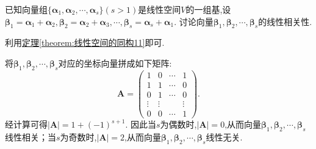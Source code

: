 \documentclass[../../main.tex]{subfiles}%
\begin{document}
\begin{example}
已知向量组\(\{\boldsymbol{\alpha}_1,\boldsymbol{\alpha}_2,\cdots,\boldsymbol{\alpha}_s\}(s > 1)\)是线性空间\(V\)的一组基,设\(\boldsymbol{\beta}_1=\boldsymbol{\alpha}_1+\boldsymbol{\alpha}_2,\boldsymbol{\beta}_2=\boldsymbol{\alpha}_2+\boldsymbol{\alpha}_3,\cdots,\boldsymbol{\beta}_s=\boldsymbol{\alpha}_s+\boldsymbol{\alpha}_1\). 讨论向量\(\boldsymbol{\beta}_1,\boldsymbol{\beta}_2,\cdots,\boldsymbol{\beta}_s\)的线性相关性.
\end{example}
\begin{note}
利用\hyperref[theorem:线性空间的同构11]{定理\ref{theorem:线性空间的同构11}}即可.
\end{note}
\begin{solution}

将\(\boldsymbol{\beta}_1,\boldsymbol{\beta}_2,\cdots,\boldsymbol{\beta}_s\)对应的坐标向量拼成如下矩阵:
\[
\boldsymbol{A}=\begin{pmatrix}
1&0&\cdots&1\\
1&1&\cdots&0\\
0&1&\cdots&0\\
\vdots&\vdots&&\vdots\\
0&0&\cdots&1
\end{pmatrix}.
\]
经计算可得\(|\boldsymbol{A}| = 1+(-1)^{s + 1}\). 因此当\(s\)为偶数时,\(|\boldsymbol{A}| = 0\),从而向量\(\boldsymbol{\beta}_1,\boldsymbol{\beta}_2,\cdots,\boldsymbol{\beta}_s\)线性相关；当\(s\)为奇数时,\(|\boldsymbol{A}| = 2\),从而向量\(\boldsymbol{\beta}_1,\boldsymbol{\beta}_2,\cdots,\boldsymbol{\beta}_s\)线性无关. 

\end{solution}
\end{document}
